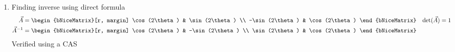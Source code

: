 \begin{enumerate}
    \item Finding inverse using direct formula
          \begin{align}
              \vec{A}       & = \begin{bNiceMatrix}[r, margin]
                                    \cos(2\theta)  & \sin(2\theta) \\
                                    -\sin(2\theta) & \cos(2\theta)
                                \end{bNiceMatrix} &
              \det(\vec{A}) & = 1                              \\
              \vec{A}^{-1}  & = \begin{bNiceMatrix}[r, margin]
                                    \cos(2\theta) & -\sin(2\theta) \\
                                    \sin(2\theta) & \cos(2\theta)
                                \end{bNiceMatrix}
          \end{align}
          Verified using a CAS


\end{enumerate}
